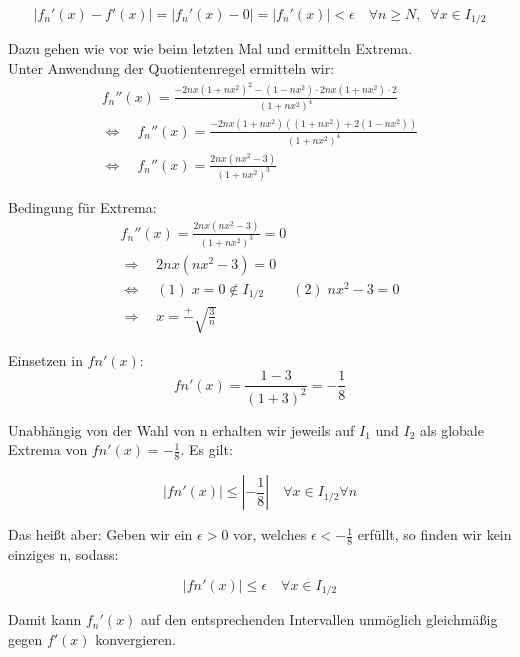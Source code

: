 \documentclass[a4paper,german,12pt,smallheadings]{scrartcl}
\begin{document}
\begin{equation*}
|f_n'(x)-f'(x)|=|f_n'(x)-0|=|f_n'(x)|<\epsilon \quad \forall n\ge N, \;\; \forall x\in I_{1/2}
\end{equation*}

Dazu gehen wie vor wie beim letzten Mal und ermitteln Extrema.\\
Unter Anwendung der Quotientenregel ermitteln wir:
\begin{align*}
f_n''(x)=\frac{-2nx\left(1+nx^2\right)^2-\left(1-nx^2\right)\cdot 2nx\left(1+nx^2\right)\cdot 2}{\left(1+nx^2\right)^4}\\
\Leftrightarrow \quad f_n''(x)=\frac{-2nx\left(1+nx^2\right)\left(\left(1+nx^2\right)+2\left(1-nx^2\right)\right)}{\left(1+nx^2\right)^4}\\
\Leftrightarrow \quad f_n''(x)=\frac{2nx\left(nx^2-3\right)}{\left(1+nx^2\right)^3}
\end{align*}

Bedingung für Extrema:
\begin{align*}
f_n''(x)=\frac{2nx\left(nx^2-3\right)}{\left(1+nx^2\right)^3}=0\\
\Rightarrow \quad 2nx\left(nx^2-3\right)=0\\
\Leftrightarrow \quad (1)\;x=0\notin I_{1/2} \quad \quad (2)\;nx^2-3=0\\
\Rightarrow \quad x=\overset{+}{-}\sqrt{\frac{3}{n}} 
\end{align*}

Einsetzen in $fn'(x)$:
\begin{equation*}
fn'(x)=\frac{1-3}{\left(1+3\right)^2}=-\frac{1}{8}
\end{equation*}

Unabhängig von der Wahl von n erhalten wir jeweils auf $I_1$ und $I_2$ als globale Extrema von $fn'(x)=-\frac{1}{8}$. Es gilt:

\begin{equation*}
|fn'(x)|\leq\left|-\frac{1}{8}\right| \quad \forall x\in I_{1/2} \forall n
\end{equation*}

Das heißt aber: Geben wir ein $\epsilon>0$ vor, welches $\epsilon<-\frac{1}{8}$ erfüllt, so finden wir kein einziges n, sodass:

\begin{equation*}
|fn'(x)|\le\epsilon \quad \forall x \in I_{1/2}
\end{equation*}

Damit kann $f_n'(x)$ auf den entsprechenden Intervallen unmöglich gleichmäßig gegen $f'(x)$ konvergieren.
\end{document}
